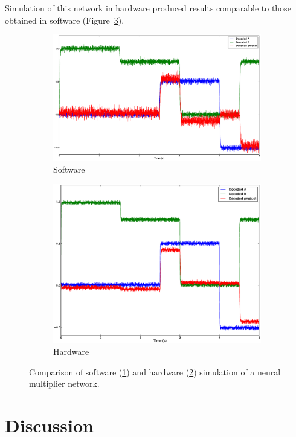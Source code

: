 \documentclass[english]{article}
\begin{document}
Simulation of this network in hardware produced results comparable to those obtained in software
(Figure~\ref{fig:multiplier}).

\begin{figure}
\centering


\begin{subfigure}[b]{0.4\textwidth}
\centering
\includegraphics[width=4in]{multiplier-sw.eps}
\caption{Software}
\label{fig:multiplier:sw}
\end{subfigure}

\begin{subfigure}[b]{0.4\textwidth}
\centering
\includegraphics[width=4in]{multiplier.eps}
\caption{Hardware}
\label{fig:multiplier:hw}
\end{subfigure}

\caption[Multiplier simulation comparison.]
{Comparison of software (\ref{fig:multiplier:sw}) and hardware (\ref{fig:multiplier:hw})
simulation of a neural multiplier network.}
\label{fig:multiplier}
\end{figure}

\section{Discussion}
\end{document}
